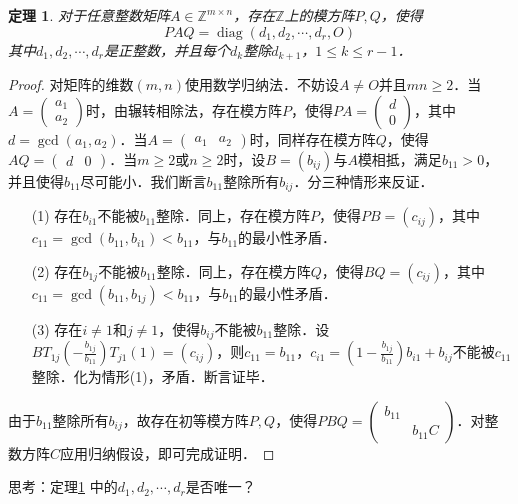 \documentclass[a4paper,fontset=windows]{ctexbook}
\newtheorem{theorem}{定理}[chapter]
\theoremstyle{definition}
\DeclareMathOperator{\diag}{diag}
\def\note{\noindent\raisebox{10pt}{\dbend}\hspace{7pt}}
\renewcommand{\le}{\leqslant}
\renewcommand{\ge}{\geqslant}
\begin{document}
\begin{theorem}\label{thm4.12}
对于任意整数矩阵$A\in\mathbb{Z}^{m\times n}$，存在$\mathbb{Z}$上的模方阵$P,Q$，使得
\begin{equation}\label{eq4.2}
PAQ=\diag(d_1,d_2,\cdots,d_r,O)
\end{equation}
其中$d_1,d_2,\cdots,d_r$是正整数，并且每个$d_k$整除$d_{k+1}$，$1\le k\le r-1$．
\end{theorem}

\begin{proof}
对矩阵的维数$(m,n)$使用数学归纳法．不妨设$A\ne O$并且$mn\ge 2$．当$A=\begin{pmatrix}a_1 \\ a_2\end{pmatrix}$时，由辗转相除法，存在模方阵$P$，使得$PA=\begin{pmatrix}d \\ 0\end{pmatrix}$，其中$d=\gcd(a_1,a_2)$．当$A=\begin{pmatrix}a_1&a_2\end{pmatrix}$时，同样存在模方阵$Q$，使得$AQ=\begin{pmatrix}d&0\end{pmatrix}$．当$m\ge 2$或$n\ge 2$时，设$B=(b_{ij})$与$A$模相抵，满足$b_{11}>0$，并且使得$b_{11}$尽可能小．我们断言$b_{11}$整除所有$b_{ij}$．分三种情形来反证．
\begin{itemize}
\item[(1)]存在$b_{i1}$不能被$b_{11}$整除．同上，存在模方阵$P$，使得$PB=(c_{ij})$，其中$c_{11}=\gcd(b_{11},b_{i1})<b_{11}$，与$b_{11}$的最小性矛盾．
\item[(2)]存在$b_{1j}$不能被$b_{11}$整除．同上，存在模方阵$Q$，使得$BQ=(c_{ij})$，其中$c_{11}=\gcd(b_{11},b_{1j})<b_{11}$，与$b_{11}$的最小性矛盾．
\item[(3)]存在$i\ne 1$和$j\ne 1$，使得$b_{ij}$不能被$b_{11}$整除．设$BT_{1j}(-\frac{b_{1j}}{b_{11}})T_{j1}(1)=(c_{ij})$，则$c_{11}=b_{11}$，$c_{i1}=(1-\frac{b_{1j}}{b_{11}})b_{i1}+b_{ij}$不能被$c_{11}$整除．化为情形(1)，矛盾．断言证毕．
\end{itemize}
由于$b_{11}$整除所有$b_{ij}$，故存在初等模方阵$P,Q$，使得$PBQ=\begin{pmatrix}b_{11}& \\ &b_{11}C\end{pmatrix}$．对整数方阵$C$应用归纳假设，即可完成证明．
\end{proof}

\note 思考：定理\ref{thm4.12} 中的$d_1,d_2,\cdots,d_r$是否唯一？
\end{document}
